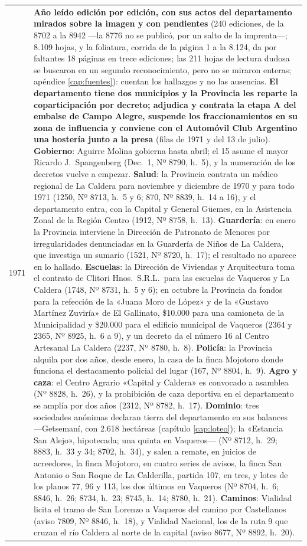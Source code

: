 \begin{longtable}{@{}p{2.7cm}p{10.3cm}@{}}
1971 & \textbf{Año leído edición por edición, con sus actos del departamento mirados sobre la imagen y con pendientes} (240 ediciones, de la 8702 a la 8942 ---la 8776 no se publicó, por un salto de la imprenta---; 8.109 hojas, y la foliatura, corrida de la página 1 a la 8.124, da por faltantes 18 páginas en trece ediciones; las 211 hojas de lectura dudosa se buscaron en un segundo reconocimiento, pero no se miraron enteras; apéndice \ref{cap:fuentes}): cuentan los hallazgos y no las ausencias. \textbf{El departamento tiene dos municipios y la Provincia les reparte la coparticipación por decreto; adjudica y contrata la etapa A del embalse de Campo Alegre, suspende los fraccionamientos en su zona de influencia y conviene con el Automóvil Club Argentino una hostería junto a la presa} (filas de 1971 y del 13 de julio). \textbf{Gobierno}: Aguirre Molina gobierna hasta abril; el 15 asume el mayor Ricardo J.\ Spangenberg (Dec.\ 1, Nº 8790, h.\ 5), y la numeración de los decretos vuelve a empezar. \textbf{Salud}: la Provincia contrata un médico regional de La Caldera para noviembre y diciembre de 1970 y para todo 1971 (1250, Nº 8713, h.\ 5 y 6; 870, Nº 8839, h.\ 14 a 16), y el departamento entra, con la Capital y General Güemes, en la Asistencia Zonal de la Región Centro (1912, Nº 8758, h.\ 13). \textbf{Guardería}: en enero la Provincia interviene la Dirección de Patronato de Menores por irregularidades denunciadas en la Guardería de Niños de La Caldera, que investiga un sumario (1521, Nº 8720, h.\ 17); el resultado no aparece en lo hallado. \textbf{Escuelas}: la Dirección de Viviendas y Arquitectura toma el contrato de Clitori Hnos.\ S.R.L.\ para las escuelas de Vaqueros y La Caldera (1748, Nº 8731, h.\ 5 y 6); en octubre la Provincia da fondos para la refección de la «Juana Moro de López» y de la «Gustavo Martínez Zuviría» de El Gallinato, \$10.000 para una camioneta de la Municipalidad y \$20.000 para el edificio municipal de Vaqueros (2364 y 2365, Nº 8925, h.\ 6 a 9), y un decreto da el número 16 al Centro Artesanal La Caldera (2237, Nº 8780, h.\ 8). \textbf{Policía}: la Provincia alquila por dos años, desde enero, la casa de la finca Mojotoro donde funciona el destacamento policial del lugar (167, Nº 8804, h.\ 9). \textbf{Agro y caza}: el Centro Agrario «Capital y Caldera» es convocado a asamblea (Nº 8828, h.\ 26), y la prohibición de caza deportiva en el departamento se amplía por dos años (2312, Nº 8782, h.\ 17). \textbf{Dominio}: tres sociedades anónimas declaran tierra del departamento en sus balances ---Getsemaní, con 2.618 hectáreas (capítulo \ref{cap:loteo}); la «Estancia San Alejo», hipotecada; una quinta en Vaqueros--- (Nº 8712, h.\ 29; 8883, h.\ 33 y 34; 8702, h.\ 34), y salen a remate, en juicios de acreedores, la finca Mojotoro, en cuatro series de avisos, la finca San Antonio o San Roque de La Calderilla, partida 107, en tres, y lotes de los planos 77, 96 y 113, los dos últimos en Vaqueros (Nº 8704, h.\ 6; 8846, h.\ 26; 8734, h.\ 23; 8745, h.\ 14; 8780, h.\ 21). \textbf{Caminos}: Vialidad licita el tramo de San Lorenzo a Vaqueros del camino por Castellanos (aviso 7809, Nº 8846, h.\ 18), y Vialidad Nacional, los de la ruta 9 que cruzan el río Caldera al norte de la capital (aviso 8677, Nº 8892, h.\ 20). \\

\end{longtable}
